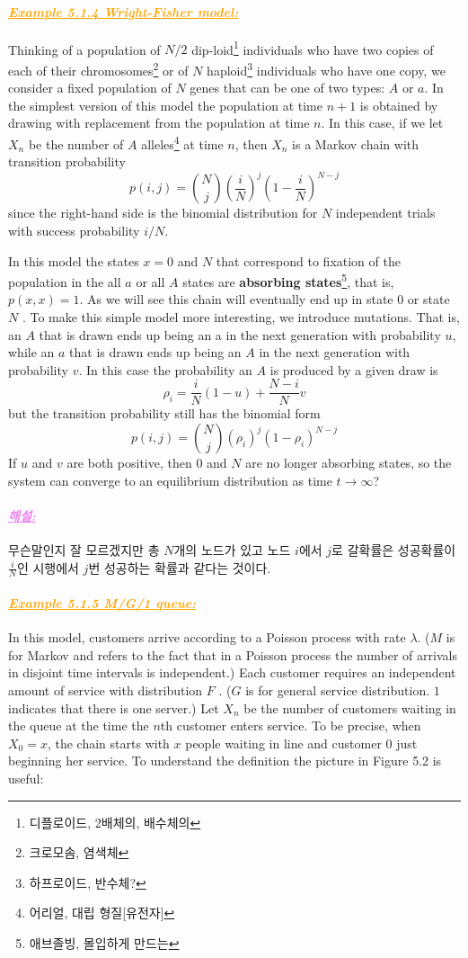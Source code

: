 \documentclass[12pt,oneside,english,a4paper]{article}
\newcommand{\paraviolet}[1]{\paragraph{\LARGE\textcolor{violet}{\it\underline{\textbf{#1:}}}}\LARGE}
\newcommand{\paraorange}[1]{\paragraph{\LARGE\textcolor{orange}{\it\underline{\textbf{#1:}}}}\LARGE}
\begin{document}
\paraorange{Example 5.1.4 Wright-Fisher model} 
Thinking of a population of $N/2$ dip-loid\footnote{디플로이드, 2배체의, 배수체의} individuals who have two copies of each of their chromosomes\footnote{크로모솜, 염색체} or of $N$ haploid\footnote{하프로이드, 반수체?} individuals who have one copy, we consider a
fixed population of $N$ genes that can be one of two types: $A$ or $a$. In the
simplest version of this model the population at time $n+1$ is obtained by
drawing with replacement from the population at time $n$. In this case,
if we let $X_n$ be the number of $A$ alleles\footnote{어리얼, 대립 형질[유전자]} at time $n$, then $X_n$ is a Markov chain with transition probability
\[
p(i,j)=\binom{N}{j}\left(\frac{i}{N}\right)^{j}\left(1-\frac{i}{N}\right)^{N-j}
\]
since the right-hand side is the binomial distribution for $N$ independent
trials with success probability $i/N$.

In this model the states $x = 0$ and $N$ that correspond to fixation of
the population in the all $a$ or all $A$ states are \textbf{absorbing states}\footnote{애브졸빙, 몰입하게 만드는}, that
is, $p(x, x) = 1$. As we will see this chain will eventually end up in state
$0$ or state $N$ . To make this simple model more interesting, we introduce mutations. That is, an $A$ that is drawn ends up being an a in the next
generation with probability $u$, while an $a$ that is drawn ends up being an
$A$ in the next generation with probability $v$. In this case the probability an $A$ is produced by a given draw is
\[
\rho_i=\frac{i}{N}(1-u)+\frac{N-i}{N}v
\]
but the transition probability still has the binomial form
\[
p(i,j)=\binom{N}{j}(\rho_i)^j(1-\rho_i)^{N-j}
\]
If $u$ and $v$ are both positive, then $0$ and $N$ are no longer absorbing states, so the system can converge to an equilibrium distribution as time $t \to \infty$?

\paraviolet{해설} 무슨말인지 잘 모르겠지만 총 $N$개의 노드가 있고 노드 $i$에서 $j$로 갈확률은 성공확률이 $\frac{i}{N}$인 시행에서 $j$번 성공하는 확률과 같다는 것이다. 

\paraorange{Example 5.1.5 M/G/1 queue} In this model, customers arrive according to a Poisson process with rate $\lambda$. ($M$ is for Markov and refers
to the fact that in a Poisson process the number of arrivals in disjoint
time intervals is independent.) Each customer requires an independent
amount of service with distribution $F$ . ($G$ is for general service distribution. $1$ indicates that there is one server.) Let $X_n$ be the number of customers waiting in the queue at the time the $n$th customer enters service. To be precise, when $X_0 = x$, the chain starts with $x$ people waiting in line and customer $0$ just beginning her service. To understand the definition the picture in Figure 5.2 is useful:
\end{document}
